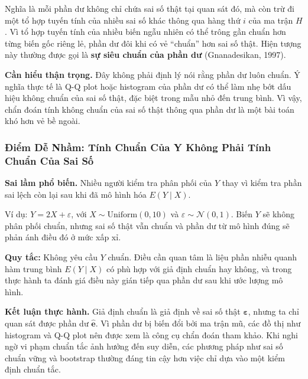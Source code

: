 Nghĩa là mỗi phần dư không chỉ chứa sai số thật tại quan sát đó, mà còn trừ đi một tổ hợp tuyến tính của nhiều sai số khác thông qua hàng thứ $i$ của ma trận $H$. Vì tổ hợp tuyến tính của nhiều biến ngẫu nhiên có thể trông gần chuẩn hơn từng biến gốc riêng lẻ, phần dư đôi khi có vẻ ``chuẩn'' hơn sai số thật. Hiện tượng này thường được gọi là \textbf{sự siêu chuẩn của phần dư} (Gnanadesikan, 1997).

\textbf{Cần hiểu thận trọng.} Đây không phải định lý nói rằng phần dư luôn chuẩn. Ý nghĩa thực tế là Q-Q plot hoặc histogram của phần dư có thể làm nhẹ bớt dấu hiệu không chuẩn của sai số thật, đặc biệt trong mẫu nhỏ đến trung bình. Vì vậy, chẩn đoán tính không chuẩn của sai số thật thông qua phần dư là một bài toán khó hơn vẻ bề ngoài.

\subsubsection{Điểm Dễ Nhầm: Tính Chuẩn Của Y Không Phải Tính Chuẩn Của Sai Số}

\textbf{Sai lầm phổ biến.} Nhiều người kiểm tra phân phối của $Y$ thay vì kiểm tra phần sai lệch còn lại sau khi đã mô hình hóa $E(Y \mid X)$.

Ví dụ: $Y = 2X + \varepsilon$, với $X \sim \mathrm{Uniform}(0,10)$ và $\varepsilon \sim \mathcal{N}(0,1)$. Biến $Y$ sẽ không phân phối chuẩn, nhưng sai số thật vẫn chuẩn và phần dư từ mô hình đúng sẽ phản ánh điều đó ở mức xấp xỉ.

\textbf{Quy tắc:} Không yêu cầu $Y$ chuẩn. Điều cần quan tâm là liệu phần nhiễu quanh hàm trung bình $E(Y \mid X)$ có phù hợp với giả định chuẩn hay không, và trong thực hành ta đánh giá điều này gián tiếp qua phần dư sau khi ước lượng mô hình.

\begin{notebox}
\textbf{Kết luận thực hành.} Giả định chuẩn là giả định về sai số thật $\boldsymbol{\varepsilon}$, nhưng ta chỉ quan sát được phần dư $\hat{\mathbf{e}}$. Vì phần dư bị biến đổi bởi ma trận mũ, các đồ thị như histogram và Q-Q plot nên được xem là công cụ chẩn đoán tham khảo. Khi nghi ngờ vi phạm chuẩn tắc ảnh hưởng đến suy diễn, các phương pháp như sai số chuẩn vững và bootstrap thường đáng tin cậy hơn việc chỉ dựa vào một kiểm định chuẩn tắc.
\end{notebox}

